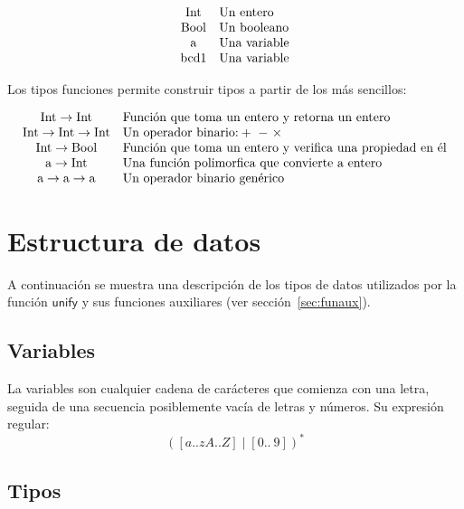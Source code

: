 \documentclass{article}
\newcommand{\ms}[1]{\mathsf{#1}}
\theoremstyle{definition}
\begin{document}
\[
  \begin{array}[h]{cl}
    \text{Int} & \text{Un entero} \\
    \text{Bool} & \text{Un booleano} \\
    \text{a} & \text{Una variable} \\
    \text{bcd1} & \text{Una variable} \\
  \end{array}
\]

Los tipos funciones permite construir tipos a partir de los más
sencillos:

\[
  \begin{array}[h]{cl}
    \text{Int} \to \text{Int} & \text{Función que toma un entero y retorna un entero} \\
    \text{Int} \to \text{Int} \to \text{Int} & \text{Un operador binario:} +\ -\ \times\ \\
    \text{Int} \to \text{Bool} & \text{Función que toma un entero y verifica una propiedad en él} \\
    \text{a} \to \text{Int} & \text{Una función polimorfica que convierte a entero} \\
    \text{a} \to \text{a} \to \text{a} & \text{Un operador binario genérico} \\
  \end{array}
\]

\section{Estructura de datos}\label{sec:estructdatos}

A continuación se muestra una descripción de los tipos de datos
utilizados por la función $\ms{unify}$ y sus funciones auxiliares (ver
sección~\ref{sec:funaux}).

\subsection{Variables}
\label{sec:var}

La variables son cualquier cadena de carácteres que comienza con una letra,
seguida de una secuencia posiblemente vacía de letras y números. Su expresión
regular:
\begin{equation*}
  [a..zA..Z]([a..zA..Z] \mid [0 ..\ 9])^*
\end{equation*}

\subsection{Tipos}
\label{sec:estrutipos}
\end{document}
